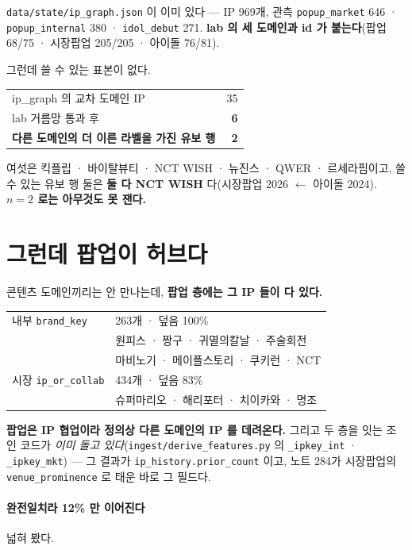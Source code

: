 \documentclass[10pt]{article}
\begin{document}
\texttt{data/state/ip\_graph.json} 이 이미 있다 --- IP 969개, 관측
\texttt{popup\_market} 646 · \texttt{popup\_internal} 380 ·
\texttt{idol\_debut} 271. \textbf{lab 의 세 도메인과 id 가 붙는다}(팝업
68/75 · 시장팝업 205/205 · 아이돌 76/81).

그런데 쓸 수 있는 표본이 없다.

\begin{center}\small
\begin{tabular}{lr}
\hline
ip\_graph 의 교차 도메인 IP & 35 \\
lab 거름망 통과 후 & \textbf{6} \\
\hline
\textbf{다른 도메인의 더 이른 라벨을 가진 유보 행} & \textbf{2} \\
\hline
\end{tabular}
\end{center}

여섯은 킥플립 · 바이탈뷰티 · NCT WISH · 뉴진스 · QWER · 르세라핌이고,
쓸 수 있는 유보 행 둘은 \textbf{둘 다 NCT WISH} 다(시장팝업 2026 $\leftarrow$
아이돌 2024). \textbf{$n{=}2$ 로는 아무것도 못 잰다.}

\section{그런데 팝업이 허브다}

콘텐츠 도메인끼리는 안 만나는데, \textbf{팝업 층에는 그 IP 들이 다 있다.}

\begin{center}\small
\begin{tabular}{ll}
\hline
내부 \texttt{brand\_key} & 263개 · 덮음 100\% \\
& 원피스 · 짱구 · 귀멸의칼날 · 주술회전 \\
& 마비노기 · 메이플스토리 · 쿠키런 · NCT \\
\hline
시장 \texttt{ip\_or\_collab} & 434개 · 덮음 83\% \\
& 슈퍼마리오 · 해리포터 · 치이카와 · 명조 \\
\hline
\end{tabular}
\end{center}

\textbf{팝업은 IP 협업이라 정의상 다른 도메인의 IP 를 데려온다.} 그리고 두
층을 잇는 조인 코드가 \emph{이미 돌고 있다}(\texttt{ingest/derive\_features.py}
의 \texttt{\_ipkey\_int} · \texttt{\_ipkey\_mkt}) --- 그 결과가
\texttt{ip\_history.prior\_count} 이고, 노트 284가 시장팝업의
\texttt{venue\_prominence} 로 태운 바로 그 필드다.

\paragraph{완전일치라 12\% 만 이어진다} 넓혀 봤다.
\end{document}
